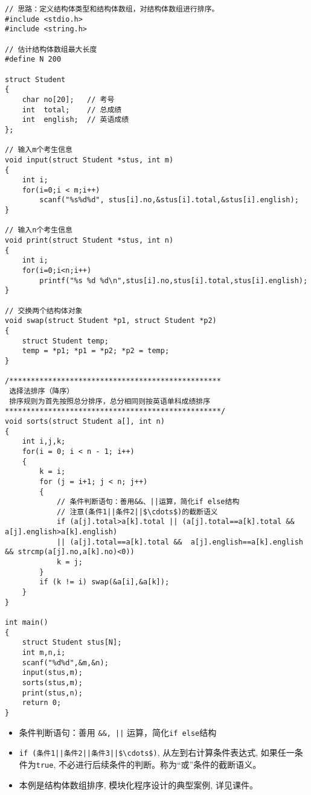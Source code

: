 \begin{lstlisting}
// 思路：定义结构体类型和结构体数组，对结构体数组进行排序。 
#include <stdio.h>
#include <string.h>

// 估计结构体数组最大长度 
#define N 200

struct Student 
{
	char no[20];   // 考号 
	int  total;    // 总成绩 
	int  english;  // 英语成绩  
};

// 输入m个考生信息
void input(struct Student *stus, int m)
{
	int i;
	for(i=0;i < m;i++) 
		scanf("%s%d%d",	stus[i].no,&stus[i].total,&stus[i].english); 
}

// 输入n个考生信息
void print(struct Student *stus, int n)
{
	int i;
	for(i=0;i<n;i++) 
		printf("%s %d %d\n",stus[i].no,stus[i].total,stus[i].english); 
}

// 交换两个结构体对象 
void swap(struct Student *p1, struct Student *p2)
{
	struct Student temp;
	temp = *p1; *p1 = *p2; *p2 = temp;
}

/************************************************* 
 选择法排序（降序）
 排序规则为首先按照总分排序，总分相同则按英语单科成绩排序
**************************************************/ 
void sorts(struct Student a[], int n)
{
	int i,j,k;
	for(i = 0; i < n - 1; i++)
	{
		k = i;
		for (j = i+1; j < n; j++)
		{
			// 条件判断语句：善用&&、||运算，简化if else结构 
			// 注意(条件1||条件2||$\cdots$)的截断语义
			if (a[j].total>a[k].total || (a[j].total==a[k].total &&  a[j].english>a[k].english)
			|| (a[j].total==a[k].total &&  a[j].english==a[k].english && strcmp(a[j].no,a[k].no)<0))  
			k = j;
		}
		if (k != i) swap(&a[i],&a[k]);
	} 
}

int main()
{
	struct Student stus[N]; 
	int m,n,i;
	scanf("%d%d",&m,&n);
	input(stus,m); 
	sorts(stus,m);
	print(stus,n);
	return 0;
}
\end{lstlisting}

\begin{note}[要点]
	\begin{itemize}
		\item 条件判断语句：善用 \lstinline$&&, ||$ 运算，简化\lstinline|if else|结构
		\item \lstinline!if (条件1||条件2||条件3||$\cdots$)!, 从左到右计算条件表达式, 如果任一条件为\lstinline|true|, 不必进行后续条件的判断。称为``或''条件的截断语义。
		\item 本例是结构体数组排序, 模块化程序设计的典型案例,  详见课件。 
	\end{itemize}
\end{note}

